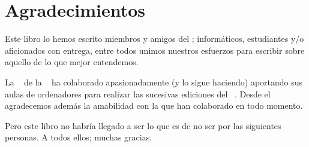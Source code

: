 
\chapter*{Agradecimientos}

\label{Agradecimientos}

Este  libro   lo  hemos   escrito  miembros   y  amigos   del  \GULiC;
informáticos,  estudiantes y/o  aficionados con  entrega, entre  todos
unimos nuestros esfuerzos para escribir  sobre aquello de lo que mejor
entendemos.

La  \FMAT~ de  la  \ULL~  ha colaborado  apasionadamente  (y lo  sigue
haciendo)  aportando  sus  aulas  de  ordenadores  para  realizar  las
sucesivas ediciones del \CILA~. Desde el \GULiC~ agradecemos además la
amabilidad con la que han colaborado en todo momento.

Pero este libro  no habría llegado a ser  lo que es de no  ser por las
siguientes personas. A todos ellos; muchas gracias.

